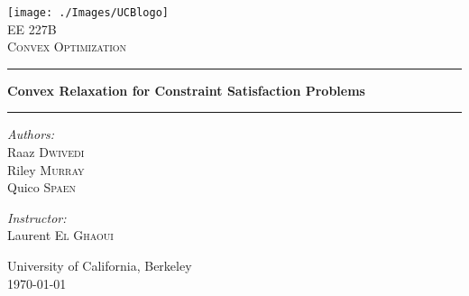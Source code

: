 \begin{titlepage}
	
	\begin{center}
		\vspace{10cm}
		
		\texttt{[image: ./Images/UCBlogo]}\\[3cm]    
		
		\normalsize EE 227B\\
		\textsc{\large Convex Optimization}\\[1cm]		
		
		\hrule 
		\vspace{1 cm}
		{ \Large \textbf{Convex Relaxation for Constraint Satisfaction Problems}\\[0.5cm]
			\vspace{0.5 cm}
			\hrule
			\vspace{1.5 cm}
			
			\begin{minipage}[t]{0.4\textwidth}
				\begin{flushleft} \large
					\emph{Authors:}\\
					\vspace{0.7ex}
					Raaz \textsc{Dwivedi}\\
					Riley \textsc{Murray}\\
					Quico \textsc{Spaen}
				\end{flushleft}
			\end{minipage}
			\begin{minipage}[t]{0.4\textwidth}
				\begin{flushright} \large
					\emph{Instructor:} \\
					\vspace{0.7ex}
					Laurent \textsc{El Ghaoui}\\[0.3 cm]
				\end{flushright}
			\end{minipage}
			\vfill 
			University of California, Berkeley\\[.5cm]
			\large \today}
		
	\end{center}
	
\end{titlepage}

